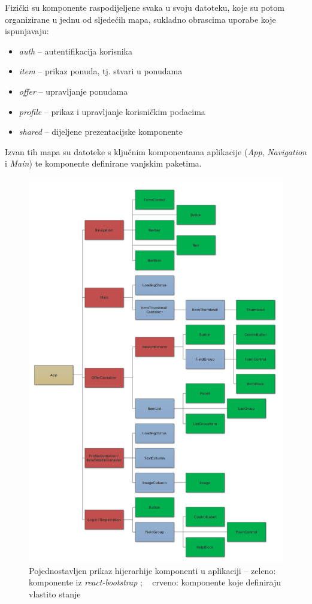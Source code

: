 \documentclass[times, utf8, zavrsni, numeric]{fer}
\newcommand{\razmakp}{\vspace{18pt}}
\begin{document}
\razmakp
\razmakp

Fizički su komponente raspodijeljene svaka u svoju datoteku, koje su potom organizirane u jednu od sljedećih mapa, sukladno obrascima uporabe koje ispunjavaju:
\begin{itemize}
  \item \emph{auth} -- autentifikacija korisnika
  \item \emph{item} -- prikaz ponuda, tj. stvari u ponudama
  \item \emph{offer} -- upravljanje ponudama
  \item \emph{profile} -- prikaz i upravljanje korisničkim podacima
  \item \emph{shared} -- dijeljene prezentacijske komponente
\end{itemize}
Izvan tih mapa su datoteke s ključnim komponentama aplikacije (\emph{App}, \emph{Navigation} i \emph{Main}) te komponente definirane vanjskim paketima.


\begin{figure}[htb]
\centering
\includegraphics[width=14.5cm]{img/components-tree2.png}
\caption{Pojednostavljen prikaz hijerarhije komponenti u aplikaciji -- zeleno: komponente iz \emph{react-bootstrap} ; ~ crveno: komponente koje definiraju vlastito stanje}
\label{fig:components-tree}
\end{figure}
\end{document}
